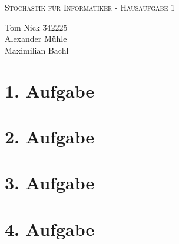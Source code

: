 \documentclass[10pt,a4paper,parskip=half]{scrartcl}
\begin{document}
\begin{center}
\textsc{\Large{Stochastik für Informatiker - Hausaufgabe 1}} \\
\end{center}
\begin{tabbing}
Tom Nick \hspace{1.4cm}\= 342225\\
Alexander Mühle\\
Maximilian Bachl
\end{tabbing}
\section*{1. Aufgabe}
\section*{2. Aufgabe}
\section*{3. Aufgabe}
\section*{4. Aufgabe}
\end{document}
